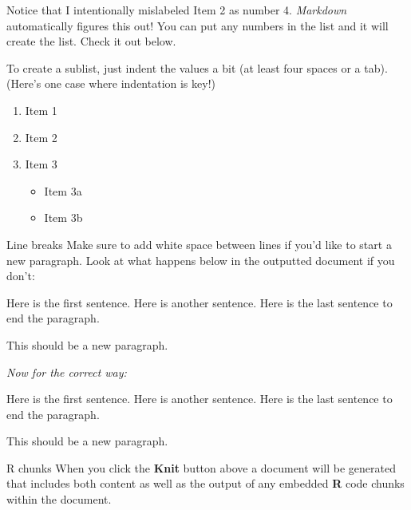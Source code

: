 \documentclass{beamer}
\providecommand{\tightlist}{\setlength{\itemsep}{0pt}\setlength{\parskip}{0pt}}
\begin{document}
\begin{frame}
Notice that I intentionally mislabeled Item 2 as number 4.
\emph{Markdown} automatically figures this out! You can put any numbers
in the list and it will create the list. Check it out below.

To create a sublist, just indent the values a bit (at least four spaces
or a tab). (Here's one case where indentation is key!)

\begin{enumerate}
\tightlist
\item
  Item 1
\item
  Item 2
\item
  Item 3

  \begin{itemize}
  \tightlist
  \item
    Item 3a
  \item
    Item 3b
  \end{itemize}
\end{enumerate}
\end{frame}

\begin{frame}
\begin{block}{Line breaks}
\protect\hypertarget{line-breaks}{}
Make sure to add white space between lines if you'd like to start a new
paragraph. Look at what happens below in the outputted document if you
don't:

Here is the first sentence. Here is another sentence. Here is the last
sentence to end the paragraph.

This should be a new paragraph.
\end{block}
\end{frame}

\begin{frame}
\emph{Now for the correct way:}

Here is the first sentence. Here is another sentence. Here is the last
sentence to end the paragraph.

This should be a new paragraph.
\end{frame}

\begin{frame}
\begin{block}{R chunks}
\protect\hypertarget{r-chunks}{}
When you click the \textbf{Knit} button above a document will be
generated that includes both content as well as the output of any
embedded \textbf{R} code chunks within the document.
\end{block}
\end{frame}
\end{document}
